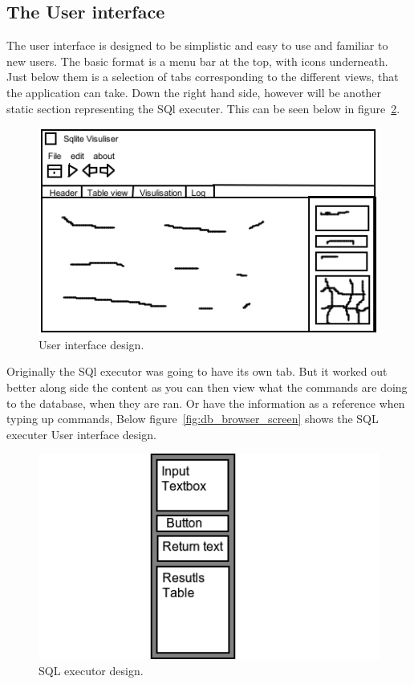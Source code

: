 \subsection{The User interface}
\label{subsec:high_user_interface}

The user interface is designed to be simplistic and easy to use and familiar to new users. The basic format is a menu bar at the top,  with icons underneath. Just below them is a selection of tabs corresponding to the different views, that the application can take. Down the right hand side, however will be another static section representing the SQl executer. This can be seen below in figure~\ref{fig:design_user_iterface}.

\begin{figure}[H]
	\centering
	\includegraphics[scale=0.7]{images/ui_design.png}
	\caption{User interface design.}
	\label{fig:design_user_iterface}
\end{figure}

Originally the SQl executor was going to have its own tab. But it worked out better along side the content as you can then view what the commands are doing to the database, when they are ran. Or have the information as a reference when typing up commands, Below figure~\ref{fig:db_browser_screen} shows the SQL executer User interface design.

\begin{figure}[H]
	\centering
	\includegraphics[scale=0.7]{images/ui_sqlexe_design.png}
	\caption{SQL executor design.}
	\label{fig:design_user_iterface}
\end{figure}

